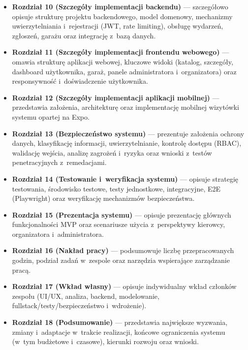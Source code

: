 \documentclass{sprz}
\begin{document}
\begin{itemize}
  \item \textbf{Rozdział 10 (Szczegóły implementacji backendu)} --- szczegółowo opisuje strukturę projektu backendowego, model domenowy, mechanizmy uwierzytelniania i~rejestracji (JWT, rate limiting), obsługę wydarzeń, zgłoszeń, garażu oraz integrację z~bazą danych.
  \item \textbf{Rozdział 11 (Szczegóły implementacji frontendu webowego)} --- omawia strukturę aplikacji webowej, kluczowe widoki (katalog, szczegóły, dashboard użytkownika, garaż, panele administratora i~organizatora) oraz responsywność i~doświadczenie użytkownika.
  \item \textbf{Rozdział 12 (Szczegóły implementacji aplikacji mobilnej)} --- przedstawia założenia, architekturę oraz implementację mobilnej wizytówki systemu opartej na Expo.
  \item \textbf{Rozdział 13 (Bezpieczeństwo systemu)} --- prezentuje założenia ochrony danych, klasyfikację informacji, uwierzytelnianie, kontrolę dostępu (RBAC), walidację wejścia, analizę zagrożeń i~ryzyka oraz wnioski z~testów penetracyjnych z~remedacjami.
  \item \textbf{Rozdział 14 (Testowanie i~weryfikacja systemu)} --- opisuje strategię testowania, środowisko testowe, testy jednostkowe, integracyjne, E2E (Playwright) oraz weryfikację mechanizmów bezpieczeństwa.
  \item \textbf{Rozdział 15 (Prezentacja systemu)} --- opisuje prezentację głównych funkcjonalności MVP oraz scenariusze użycia z~perspektywy kierowcy, organizatora i~administratora.
  \item \textbf{Rozdział 16 (Nakład pracy)} --- podsumowuje liczbę przepracowanych godzin, podział zadań w~zespole oraz narzędzia wspierające zarządzanie pracą.
  \item \textbf{Rozdział 17 (Wkład własny)} --- opisuje indywidualny wkład członków zespołu (UI/UX, analiza, backend, modelowanie, fullstack/testy/bezpieczeństwo i~wdrożenie).
  \item \textbf{Rozdział 18 (Podsumowanie)} --- przedstawia największe wyzwania, zmiany i~adaptacje w~trakcie realizacji, końcowe ograniczenia systemu (w~tym budżetowe i~czasowe), kierunki rozwoju oraz wnioski.
\end{itemize}
\end{document}
